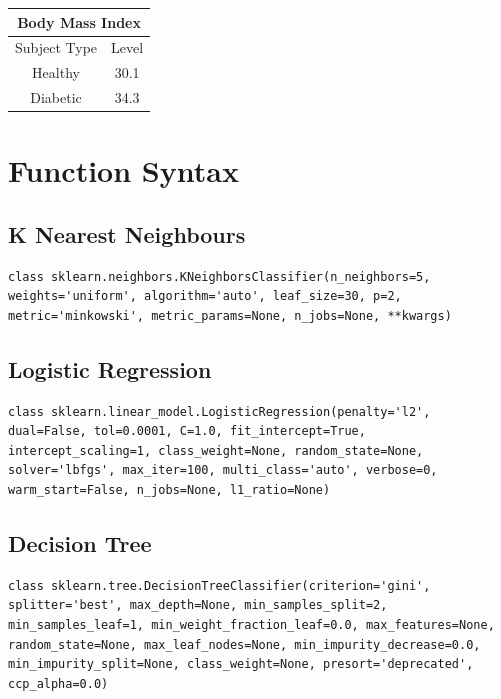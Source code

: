 \documentclass[12pt]{article}
\begin{document}
\begin{table}[]
\centering
\begin{tabular}{|c|c|}
\hline
\multicolumn{2}{|c|}{Body Mass Index} \\ \hline
Subject Type      & Level     \\ \hline
Healthy           & 30.1      \\ \hline
Diabetic          & 34.3      \\ \hline
\end{tabular}
\label{table:12}
\end{table}

\newpage
\clearpage

\section{Function Syntax}
\subsection{K Nearest Neighbours}
\begin{lstlisting}
class sklearn.neighbors.KNeighborsClassifier(n_neighbors=5, weights='uniform', algorithm='auto', leaf_size=30, p=2, metric='minkowski', metric_params=None, n_jobs=None, **kwargs)
\end{lstlisting}

\subsection{Logistic Regression}
\begin{lstlisting}
class sklearn.linear_model.LogisticRegression(penalty='l2', dual=False, tol=0.0001, C=1.0, fit_intercept=True, intercept_scaling=1, class_weight=None, random_state=None, solver='lbfgs', max_iter=100, multi_class='auto', verbose=0, warm_start=False, n_jobs=None, l1_ratio=None)
\end{lstlisting}

\subsection{Decision Tree}
\begin{lstlisting}
class sklearn.tree.DecisionTreeClassifier(criterion='gini', splitter='best', max_depth=None, min_samples_split=2, min_samples_leaf=1, min_weight_fraction_leaf=0.0, max_features=None, random_state=None, max_leaf_nodes=None, min_impurity_decrease=0.0, min_impurity_split=None, class_weight=None, presort='deprecated', ccp_alpha=0.0)
\end{lstlisting}
\end{document}
